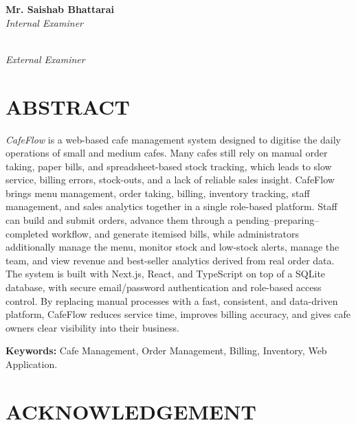 \documentclass[12pt,a4paper]{report}
\begin{document}
\vspace{22mm}
\noindent
\begin{minipage}{0.5\textwidth}
\textbf{Mr. Saishab Bhattarai}\\
\textit{Internal Examiner}
\end{minipage}%
\begin{minipage}{0.5\textwidth}
\raggedleft
\textbf{}\\[1mm]
\textit{External Examiner}
\end{minipage}

\chapter*{ABSTRACT}
\thispagestyle{plain}

\textit{CafeFlow} is a web-based cafe management system designed to digitise the daily
operations of small and medium cafes. Many cafes still rely on manual order taking, paper
bills, and spreadsheet-based stock tracking, which leads to slow service, billing errors,
stock-outs, and a lack of reliable sales insight. CafeFlow brings menu management, order
taking, billing, inventory tracking, staff management, and sales analytics together in a
single role-based platform. Staff can build and submit orders, advance them through a
pending--preparing--completed workflow, and generate itemised bills, while administrators
additionally manage the menu, monitor stock and low-stock alerts, manage the team, and view
revenue and best-seller analytics derived from real order data. The system is built with
Next.js, React, and TypeScript on top of a SQLite database, with secure email/password
authentication and role-based access control. By replacing manual processes with a fast,
consistent, and data-driven platform, CafeFlow reduces service time, improves billing
accuracy, and gives cafe owners clear visibility into their business.

\vspace{6mm}
\textbf{Keywords:} Cafe Management, Order Management, Billing, Inventory, Web Application.

\chapter*{ACKNOWLEDGEMENT}
\thispagestyle{plain}
\end{document}
